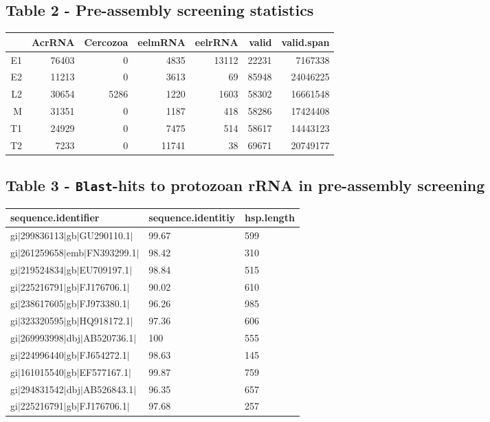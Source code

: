 \documentclass[10pt]{bmc_article}
\newenvironment{bmcformat}{\begin{raggedright}\baselineskip20pt\sloppy\setboolean{publ}{false}}{\end{raggedright}\baselineskip20pt\sloppy}
\begin{document}
\begin{bmcformat}
\subsection*{Table 2 - Pre-assembly screening statistics}
\begin{tabular}{rrrrrrr}
  \hline
 & AcrRNA & Cercozoa & eelmRNA & eelrRNA & valid & valid.span \\ 
  \hline
E1 & 76403 &   0 & 4835 & 13112 & 22231 & 7167338 \\ 
  E2 & 11213 &   0 & 3613 &  69 & 85948 & 24046225 \\ 
  L2 & 30654 & 5286 & 1220 & 1603 & 58302 & 16661548 \\ 
  M & 31351 &   0 & 1187 & 418 & 58286 & 17424408 \\ 
  T1 & 24929 &   0 & 7475 & 514 & 58617 & 14443123 \\ 
  T2 & 7233 &   0 & 11741 &  38 & 69671 & 20749177 \\ 
   \hline
\end{tabular}
\subsection*{Table 3 - \texttt{Blast}-hits to protozoan rRNA in
  pre-assembly screening}
\begin{tabular}{lll}
  \hline
sequence.identifier & sequence.identitiy & hsp.length \\ 
  \hline
gi$|$299836113$|$gb$|$GU290110.1$|$ & 99.67 & 599 \\ 
  gi$|$261259658$|$emb$|$FN393299.1$|$ & 98.42 & 310 \\ 
  gi$|$219524834$|$gb$|$EU709197.1$|$ & 98.84 & 515 \\ 
  gi$|$225216791$|$gb$|$FJ176706.1$|$ & 90.02 & 610 \\ 
  gi$|$238617605$|$gb$|$FJ973380.1$|$ & 96.26 & 985 \\ 
  gi$|$323320595$|$gb$|$HQ918172.1$|$ & 97.36 & 606 \\ 
  gi$|$269993998$|$dbj$|$AB520736.1$|$ & 100 & 555 \\ 
  gi$|$224996440$|$gb$|$FJ654272.1$|$ & 98.63 & 145 \\ 
  gi$|$161015540$|$gb$|$EF577167.1$|$ & 99.87 & 759 \\ 
  gi$|$294831542$|$dbj$|$AB526843.1$|$ & 96.35 & 657 \\ 
  gi$|$225216791$|$gb$|$FJ176706.1$|$ & 97.68 & 257 \\ 
   \hline
\end{tabular}

\end{bmcformat}
\end{document}
